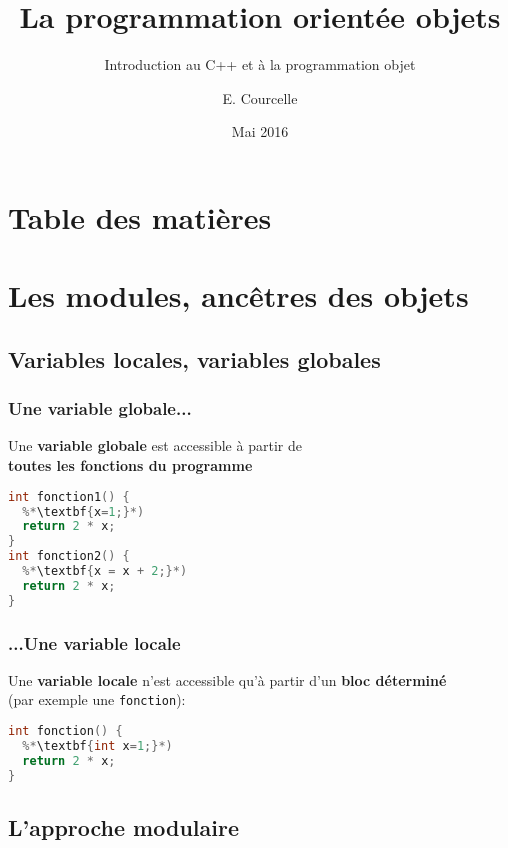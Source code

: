 \documentclass{beamer}
\title{La programmation orientée objets}
\subtitle{Introduction au C++ et à la programmation objet}
\author{E. Courcelle}\institute{CALMIP, UMS 3669}
\date{Mai 2016}
\begin{document}
\begin{frame}
\titlepage
\end{frame}

\section*{Table des matières}
\begin{frame}
\tableofcontents
\end{frame}

\section{Les modules, ancêtres des objets}

\subsection{Variables locales, variables globales}

\begin{frame}[fragile=singleslide,shrink=20]
\frametitle {Une variable globale...}
Une \textbf{variable globale} est accessible à partir de \\ \textbf{toutes les fonctions du programme}
\begin{lstlisting}[language=c++]
  %*\textbf{int x=0};*)
int fonction1() {
  %*\textbf{x=1;}*)
  return 2 * x;         
}
int fonction2() {
  %*\textbf{x = x + 2;}*)
  return 2 * x;         
}  
\end{lstlisting}
\end{frame}

\begin{frame}[fragile=singleslide,shrink=20]
\frametitle {...Une variable locale}
Une \textbf{variable locale} n'est accessible qu'à partir d'un \textbf{bloc déterminé} \\
(par exemple une \texttt{fonction}):
\begin{lstlisting}[language=c++]
int fonction() {
  %*\textbf{int x=1;}*)
  return 2 * x;         
}
\end{lstlisting}
\end{frame}

\subsection{L'approche modulaire}
\end{document}

